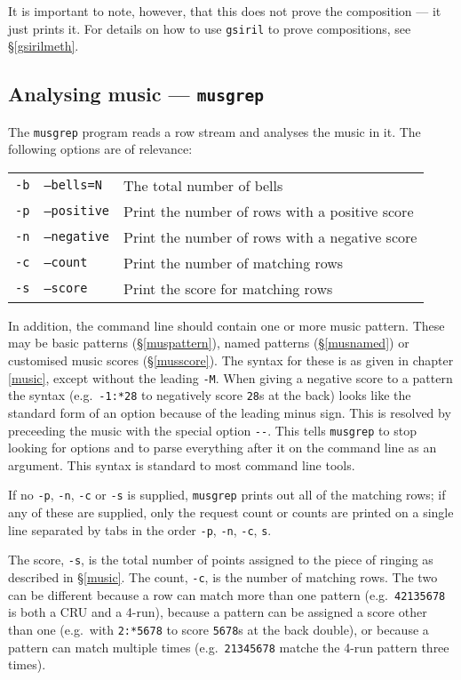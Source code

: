 \documentclass[a4paper,11pt,oneside]{book}
\makeatletter
\newcommand{\ttcmdidx}[1]{\texttt{#1}\index{#1@{\texttt{#1}}}}
\newcommand{\sref}[1]{\hyperref[#1]{\S\ref{#1}}}
\makeatother
\begin{document}
It is important to note, however, that this does not prove the composition
--- it just prints it.  For details on how to use \texttt{gsiril} to 
prove compositions, see \sref{gsirilmeth}.

\subsection{Analysing music — \texttt{musgrep}}\label{musgrep}

The \ttcmdidx{musgrep} program reads a row stream and analyses the
music in it.  The following options are of relevance:

\begin{tabularx}{\textwidth}{llX}
\texttt{-b}&\texttt{--bells=N}&The total number of bells\\
\texttt{-p}&\texttt{--positive}
   &Print the number of rows with a positive score\\
\texttt{-n}&\texttt{--negative}
  &Print the number of rows with a negative score\\
\texttt{-c}&\texttt{--count}&Print the number of matching rows\\
\texttt{-s}&\texttt{--score}&Print the score for matching rows\\
\end{tabularx}

In addition, the command line should contain one or more music pattern.
These may be basic patterns (\sref{muspattern}), named patterns 
(\sref{musnamed}) or customised music scores (\sref{musscore}). 
The syntax for these is as given in chapter \ref{music},
except without the leading \verb+-M+.  When giving a negative score to 
a pattern the syntax (e.g.\ \verb+-1:*28+ to negatively score \verb+28+s
at the back) looks like the standard form of an option because of the 
leading minus sign.  This is resolved by preceeding the music with
the special option \verb+--+.  This tells \texttt{musgrep} to stop looking
for options and to parse everything after it on the command line as an 
argument.  This syntax is standard to most command
line tools.

If no \verb+-p+, \verb+-n+, \verb+-c+ or \verb+-s+ is supplied, 
\texttt{musgrep} prints out all of the matching rows; 
if any of these are supplied, only the request count or counts are printed 
on a single line separated by tabs in the order 
\verb+-p+, \verb+-n+, \verb+-c+, \verb+s+.

The score, \verb+-s+, is the total number of points assigned to the piece
of ringing as described in \sref{music}.  The count, \verb+-c+, is the 
number of matching rows.  The two can be different because a row can match
more than one pattern (e.g.\ \verb+42135678+ is both a CRU and a 4-run), 
because a pattern can be assigned a score other than one 
(e.g.\ with \verb+2:*5678+ to score \verb+5678+s at the back double),
or because a pattern can match multiple times (e.g.\ \verb+21345678+ matche
the 4-run pattern three times).
\end{document}

